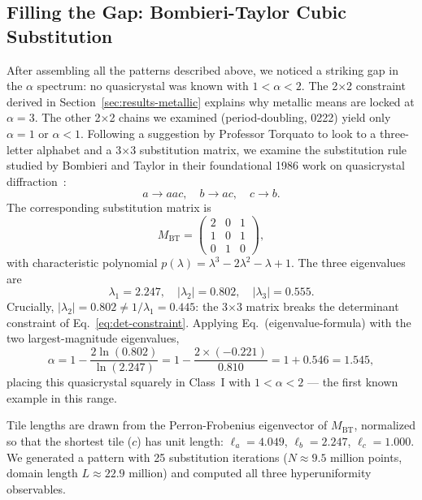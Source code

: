 \documentclass[11pt]{article}
\begin{document}
\subsection{Filling the Gap: Bombieri-Taylor Cubic Substitution}
\label{sec:bt-cubic}

After assembling all the patterns described above, we noticed a striking gap in the $\alpha$
spectrum: no quasicrystal was known with $1 < \alpha < 2$. The 2$\times$2 constraint
derived in Section~\ref{sec:results-metallic} explains why metallic means are locked at
$\alpha = 3$. The other 2$\times$2 chains we examined (period-doubling, 0222) yield only
$\alpha = 1$ or $\alpha < 1$. Following a suggestion by Professor Torquato to look to a
three-letter alphabet and a 3$\times$3 substitution matrix, we examine the substitution
rule studied by Bombieri and Taylor in their foundational 1986 work on quasicrystal
diffraction~\cite{bombieri1986which}:
\begin{equation}
  a \to aac, \quad b \to ac, \quad c \to b.
  \label{eq:bt-rule}
\end{equation}
The corresponding substitution matrix is
\begin{equation}
  M_\text{BT} = \begin{pmatrix} 2 & 0 & 1 \\ 1 & 0 & 1 \\ 0 & 1 & 0 \end{pmatrix},
  \label{eq:bt-matrix}
\end{equation}
with characteristic polynomial $p(\lambda) = \lambda^3 - 2\lambda^2 - \lambda + 1$. The
three eigenvalues are
\begin{equation}
  \lambda_1 = 2.247, \quad |\lambda_2| = 0.802, \quad |\lambda_3| = 0.555.
  \label{eq:bt-eigenvalues}
\end{equation}
Crucially, $|\lambda_2| = 0.802 \neq 1/\lambda_1 = 0.445$: the 3$\times$3 matrix breaks
the determinant constraint of Eq.~\eqref{eq:det-constraint}. Applying
Eq.~(eigenvalue-formula) with the two largest-magnitude eigenvalues,
\begin{equation}
  \alpha = 1 - \frac{2\ln(0.802)}{\ln(2.247)}
         = 1 - \frac{2 \times (-0.221)}{0.810}
         = 1 + 0.546
         = \boxed{1.545},
  \label{eq:bt-alpha}
\end{equation}
placing this quasicrystal squarely in Class~I with $1 < \alpha < 2$ --- the first known
example in this range.

Tile lengths are drawn from the Perron-Frobenius eigenvector of $M_\text{BT}$, normalized
so that the shortest tile ($c$) has unit length: $\ell_a = 4.049$, $\ell_b = 2.247$,
$\ell_c = 1.000$. We generated a pattern with 25 substitution iterations ($N \approx 9.5$
million points, domain length $L \approx 22.9$ million) and computed all three
hyperuniformity observables.
\end{document}
